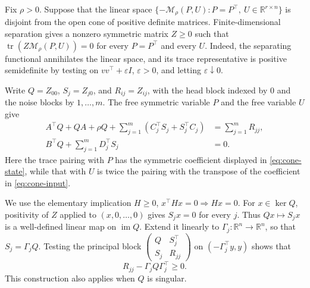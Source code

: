 \documentclass[twocolumn]{autart}
\begin{document}
\vspace{-2mm}
\begin{pf}
Fix $\rho>0$. Suppose that the linear space
$\{-\mathcal M_\rho(P,U):P=P^\top,\ U\in\mathbb R^{r\times n}\}$
is disjoint from the open cone of positive definite matrices.
Finite-dimensional separation gives a nonzero symmetric matrix $Z\geq0$
such that $\operatorname{tr}(Z\mathcal M_\rho(P,U))=0$ for every $P=P^\top$
and every $U$. Indeed, the separating functional annihilates the linear
space, and its trace representative is positive semidefinite by testing
on $vv^\top+\varepsilon I$, $\varepsilon>0$, and letting
$\varepsilon\downarrow0$.

Write $Q=Z_{00}$, $S_j=Z_{j0}$, and $R_{ij}=Z_{ij}$, with the head block
indexed by $0$ and the noise blocks by $1,\dots,m$.
The free symmetric variable $P$ and the free variable $U$ give
\begin{align}
A^\top Q+QA+\rho Q
+\sum_{j=1}^m(C_j^\top S_j+S_j^\top C_j)
&=\sum_{j=1}^mR_{jj},\label{eq:cone-state}\\
B^\top Q+\sum_{j=1}^mD_j^\top S_j&=0.\label{eq:cone-input}
\end{align}
Here the trace pairing with $P$ has the symmetric coefficient displayed
in \cref{eq:cone-state}, while that with $U$ is twice the pairing with
the transpose of the coefficient in \cref{eq:cone-input}.

We use the elementary implication $H\geq0$, $x^\top Hx=0\Rightarrow Hx=0$.
For $x\in\ker Q$, positivity of $Z$ applied to $(x,0,\dots,0)$ gives
$S_jx=0$ for every $j$. Thus $Qx\mapsto S_jx$ is a well-defined linear
map on $\operatorname{im}Q$. Extend it linearly to
$\Gamma_j:\mathbb R^n\to\mathbb R^n$, so that $S_j=\Gamma_jQ$.
Testing the principal block
$\left(\begin{smallmatrix}Q&S_j^\top\\S_j&R_{jj}\end{smallmatrix}\right)$
on $(-\Gamma_j^\top y,y)$ shows that
\begin{equation}\label{eq:cone-residual}
R_{jj}-\Gamma_jQ\Gamma_j^\top\geq0.
\end{equation}
This construction also applies when $Q$ is singular.


\end{pf}
\end{document}
